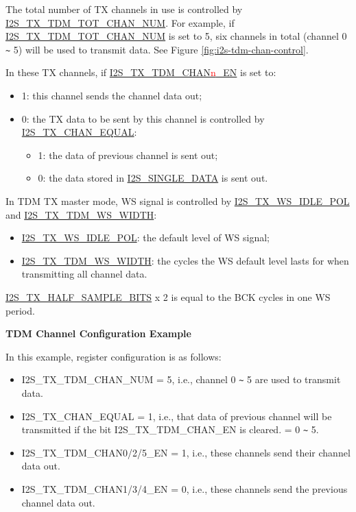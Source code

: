 \documentclass[main\_\_EN.tex]{subfiles}
\begin{document}
The total number of TX channels in use is controlled by \hyperref[fielddesc:I2STXTDMTOTCHANNUM]{I2S\_TX\_TDM\_TOT\_CHAN\_NUM}. For example, if  \hyperref[fielddesc:I2STXTDMTOTCHANNUM]{I2S\_TX\_TDM\_TOT\_CHAN\_NUM} is set to 5, six channels in total (channel 0 \verb+~+ 5) will be used to transmit data. See Figure \ref{fig:i2s-tdm-chan-control}.

In these TX channels, if \hyperref[fielddesc:I2STXTDMCHAN0EN]{I2S\_TX\_TDM\_CHAN{\textcolor{red}{n}}\_EN} is set to:

\begin{itemize}
    \item 1: this channel sends the channel data out;
    \item 0: the TX data to be sent by this channel is controlled by \hyperref[fielddesc:I2STXCHANEQUAL]{I2S\_TX\_CHAN\_EQUAL}:
    \begin{itemize}
        \item 1: the data of previous channel is sent out;
        \item 0: the data stored in \hyperref[fielddesc:I2SSINGLEDATA]{I2S\_SINGLE\_DATA} is sent out.
    \end{itemize}
\end{itemize}
In TDM TX  master mode, WS signal is controlled by \hyperref[fielddesc:I2STXWSIDLEPOL]{I2S\_TX\_WS\_IDLE\_POL} and \hyperref[fielddesc:I2STXTDMWSWIDTH]{I2S\_TX\_TDM\_WS\_WIDTH}:
\begin{itemize}
    \item \hyperref[fielddesc:I2STXWSIDLEPOL]{I2S\_TX\_WS\_IDLE\_POL}: the default level of WS signal;
    \item \hyperref[fielddesc:I2STXTDMWSWIDTH]{I2S\_TX\_TDM\_WS\_WIDTH}: the cycles the WS default level lasts for when transmitting all channel data.
\end{itemize}
\hyperref[fielddesc:I2STXHALFSAMPLEBITS]{I2S\_TX\_HALF\_SAMPLE\_BITS} x 2 is equal to the BCK cycles in one WS period.

\textbf{TDM Channel Configuration Example}

In this example, register configuration is as follows:
\begin{itemize}
    \item I2S\_TX\_TDM\_CHAN\_NUM = 5, i.e., channel 0 \verb+~+ 5 are used to transmit data.
    \item I2S\_TX\_CHAN\_EQUAL = 1, i.e., that data of previous channel will be transmitted if the bit I2S\_TX\_TDM\_CHAN\_EN is cleared.  = 0 \verb+~+ 5.
    \item I2S\_TX\_TDM\_CHAN0/2/5\_EN = 1, i.e., these channels send their channel data out.
    \item I2S\_TX\_TDM\_CHAN1/3/4\_EN = 0, i.e., these channels send the previous channel data out.
\end{itemize}
\end{document}

